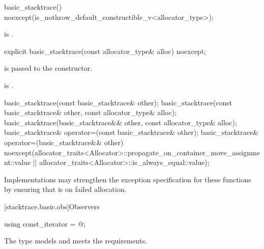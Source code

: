 %
\begin{itemdecl}
basic_stacktrace() noexcept(is_nothrow_default_constructible_v<allocator_type>);
\end{itemdecl}

\begin{itemdescr}
\pnum
\ensures
{} is .
\end{itemdescr}

%
\begin{itemdecl}
explicit basic_stacktrace(const allocator_type& alloc) noexcept;
\end{itemdecl}

\begin{itemdescr}
\pnum
\effects
{} is passed to the  constructor.

\pnum
\ensures
{} is .
\end{itemdescr}

%
%
\begin{itemdecl}
basic_stacktrace(const basic_stacktrace& other);
basic_stacktrace(const basic_stacktrace& other, const allocator_type& alloc);
basic_stacktrace(basic_stacktrace&& other, const allocator_type& alloc);
basic_stacktrace& operator=(const basic_stacktrace& other);
basic_stacktrace& operator=(basic_stacktrace&& other)
  noexcept(allocator_traits<Allocator>::propagate_on_container_move_assignment::value ||
    allocator_traits<Allocator>::is_always_equal::value);
\end{itemdecl}

\begin{itemdescr}
\pnum
\remarks
Implementations may strengthen the exception specification
for these functions
by ensuring that  is  on failed allocation.
\end{itemdescr}

[stacktrace.basic.obs]{Observers}

%
\begin{itemdecl}
using const_iterator = @\impdef@;
\end{itemdecl}

\begin{itemdescr}
\pnum
The type models
 and
meets the
 requirements.
\end{itemdescr}

